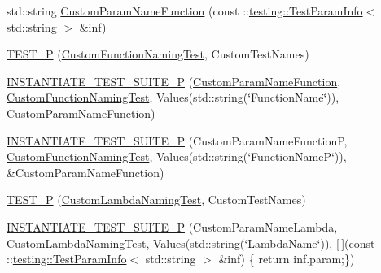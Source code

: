 \begin{DoxyCompactItemize}
\item 
std\+::string \mbox{\hyperlink{googletest-master_2googletest_2test_2googletest-param-test-test_8cc_a016a6f23e3fe3de5183e5493cf4bcc4f}{Custom\+Param\+Name\+Function}} (const \+::\mbox{\hyperlink{structtesting_1_1_test_param_info}{testing\+::\+Test\+Param\+Info}}$<$ std\+::string $>$ \&inf)
\item 
\mbox{\hyperlink{googletest-master_2googletest_2test_2googletest-param-test-test_8cc_a72ff5cb3613a060e1a62f14fa3fa1b52}{T\+E\+S\+T\+\_\+P}} (\mbox{\hyperlink{class_custom_function_naming_test}{Custom\+Function\+Naming\+Test}}, Custom\+Test\+Names)
\item 
\mbox{\hyperlink{googletest-master_2googletest_2test_2googletest-param-test-test_8cc_a07a54a2169754db4a7b3923ce3b004c4}{I\+N\+S\+T\+A\+N\+T\+I\+A\+T\+E\+\_\+\+T\+E\+S\+T\+\_\+\+S\+U\+I\+T\+E\+\_\+P}} (\mbox{\hyperlink{_obj__test_2lib_2googletest-release-1_88_81_2googletest_2test_2googletest-param-test-test_8cc_a016a6f23e3fe3de5183e5493cf4bcc4f}{Custom\+Param\+Name\+Function}}, \mbox{\hyperlink{class_custom_function_naming_test}{Custom\+Function\+Naming\+Test}}, Values(std\+::string(\char`\"{}Function\+Name\char`\"{})), Custom\+Param\+Name\+Function)
\item 
\mbox{\hyperlink{googletest-master_2googletest_2test_2googletest-param-test-test_8cc_a1a12716f19b207a803949487ced6f798}{I\+N\+S\+T\+A\+N\+T\+I\+A\+T\+E\+\_\+\+T\+E\+S\+T\+\_\+\+S\+U\+I\+T\+E\+\_\+P}} (Custom\+Param\+Name\+FunctionP, \mbox{\hyperlink{class_custom_function_naming_test}{Custom\+Function\+Naming\+Test}}, Values(std\+::string(\char`\"{}Function\+NameP\char`\"{})), \&Custom\+Param\+Name\+Function)
\item 
\mbox{\hyperlink{googletest-master_2googletest_2test_2googletest-param-test-test_8cc_af74d3252b2f4affab1dec164f84f8a20}{T\+E\+S\+T\+\_\+P}} (\mbox{\hyperlink{class_custom_lambda_naming_test}{Custom\+Lambda\+Naming\+Test}}, Custom\+Test\+Names)
\item 
\mbox{\hyperlink{googletest-master_2googletest_2test_2googletest-param-test-test_8cc_a6ba446f001925b3f5081aece4f24401b}{I\+N\+S\+T\+A\+N\+T\+I\+A\+T\+E\+\_\+\+T\+E\+S\+T\+\_\+\+S\+U\+I\+T\+E\+\_\+P}} (Custom\+Param\+Name\+Lambda, \mbox{\hyperlink{class_custom_lambda_naming_test}{Custom\+Lambda\+Naming\+Test}}, Values(std\+::string(\char`\"{}Lambda\+Name\char`\"{})), \mbox{[}$\,$\mbox{]}(const \+::\mbox{\hyperlink{structtesting_1_1_test_param_info}{testing\+::\+Test\+Param\+Info}}$<$ std\+::string $>$ \&inf) \{ return inf.\+param;\})
\item 

\end{DoxyCompactItemize}
